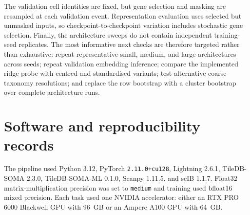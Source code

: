 \documentclass[11pt]{article}
\begin{document}
The validation cell identities are fixed, but gene selection and masking are resampled at each validation event.
Representation evaluation uses selected but unmasked inputs, so checkpoint-to-checkpoint variation includes stochastic gene selection.
Finally, the architecture sweeps do not contain independent training-seed replicates.
The most informative next checks are therefore targeted rather than exhaustive: repeat representative small, medium, and large architectures across seeds; repeat validation embedding inference; compare the implemented ridge probe with centred and standardised variants; test alternative coarse-taxonomy resolutions; and replace the row bootstrap with a cluster bootstrap over complete architecture runs.

\section{Software and reproducibility records}

The pipeline used Python 3.12, PyTorch \texttt{2.11.0+cu128}, Lightning 2.6.1, TileDB-SOMA 2.3.0, TileDB-SOMA-ML 0.1.0, Scanpy 1.11.5, and scIB 1.1.7.
Float32 matrix-multiplication precision was set to \texttt{medium} and training used bfloat16 mixed precision.
Each task used one NVIDIA accelerator: either an RTX PRO 6000 Blackwell GPU with 96~GB or an Ampere A100 GPU with 64~GB.
\end{document}
